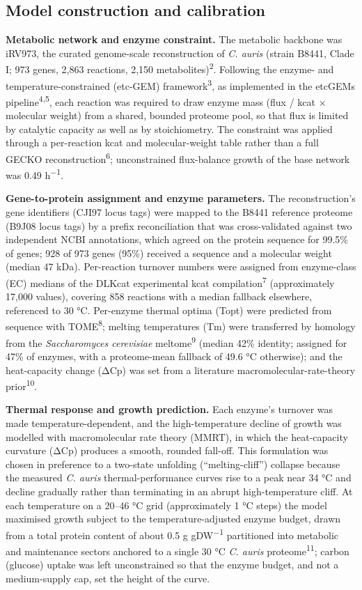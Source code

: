 \documentclass[
]{article}
\begin{document}
\subsection{Model construction and
calibration}\label{model-construction-and-calibration}

\textbf{Metabolic network and enzyme constraint.} The metabolic backbone
was iRV973, the curated genome-scale reconstruction of \emph{C. auris}
(strain B8441, Clade I; 973 genes, 2,863 reactions, 2,150
metabolites)\textsuperscript{2}. Following the enzyme- and
temperature-constrained (etc-GEM) framework\textsuperscript{3}, as
implemented in the etcGEMs pipeline\textsuperscript{4,5}, each reaction
was required to draw enzyme mass (flux / kcat × molecular weight) from a
shared, bounded proteome pool, so that flux is limited by catalytic
capacity as well as by stoichiometry. The constraint was applied through
a per-reaction kcat and molecular-weight table rather than a full GECKO
reconstruction\textsuperscript{6}; unconstrained flux-balance growth of
the base network was 0.49 h\textsuperscript{−1}.

\textbf{Gene-to-protein assignment and enzyme parameters.} The
reconstruction's gene identifiers (CJI97 locus tags) were mapped to the
B8441 reference proteome (B9J08 locus tags) by a prefix reconciliation
that was cross-validated against two independent NCBI annotations, which
agreed on the protein sequence for 99.5\% of genes; 928 of 973 genes
(95\%) received a sequence and a molecular weight (median 47 kDa).
Per-reaction turnover numbers were assigned from enzyme-class (EC)
medians of the DLKcat experimental kcat compilation\textsuperscript{7}
(approximately 17,000 values), covering 858 reactions with a median
fallback elsewhere, referenced to 30 °C. Per-enzyme thermal optima
(Topt) were predicted from sequence with TOME\textsuperscript{8};
melting temperatures (Tm) were transferred by homology from the
\emph{Saccharomyces cerevisiae} meltome\textsuperscript{9} (median 42\%
identity; assigned for 47\% of enzymes, with a proteome-mean fallback of
49.6 °C otherwise); and the heat-capacity change (ΔCp) was set from a
literature macromolecular-rate-theory prior\textsuperscript{10}.

\textbf{Thermal response and growth prediction.} Each enzyme's turnover
was made temperature-dependent, and the high-temperature decline of
growth was modelled with macromolecular rate theory (MMRT), in which the
heat-capacity curvature (ΔCp) produces a smooth, rounded fall-off. This
formulation was chosen in preference to a two-state unfolding
(``melting-cliff'') collapse because the measured \emph{C. auris}
thermal-performance curves rise to a peak near 34 °C and decline
gradually rather than terminating in an abrupt high-temperature cliff.
At each temperature on a 20--46 °C grid (approximately 1 °C steps) the
model maximised growth subject to the temperature-adjusted enzyme
budget, drawn from a total protein content of about 0.5 g
gDW\textsuperscript{−1} partitioned into metabolic and maintenance
sectors anchored to a single 30 °C \emph{C. auris}
proteome\textsuperscript{11}; carbon (glucose) uptake was left
unconstrained so that the enzyme budget, and not a medium-supply cap,
set the height of the curve.
\end{document}
